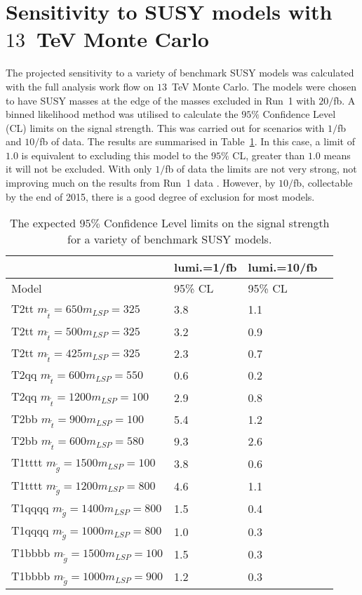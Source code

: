 
\section{Sensitivity to SUSY models with $13$~TeV Monte Carlo}
\label{sec:phys14Results}

The projected sensitivity to a variety of benchmark SUSY models was calculated with the full analysis work flow on $13$~TeV Monte Carlo. The models were chosen to have SUSY masses at the edge of the masses excluded in Run~1 with $20/$fb. A binned likelihood method was utilised to calculate the $95\%$ Confidence Level (CL) limits on the signal strength. This was carried out for scenarios with $1/$fb and $10/$fb of data. The results are summarised in Table~\ref{tab:results}. In this case, a limit of $1.0$ is equivalent to excluding this model to the $95\%$ CL, greater than $1.0$ means it will not be excluded. With only $1/$fb of data the limits are not very strong, not improving much on the results from Run~1 data \cite{susyRun1Twiki}. However, by $10/$fb, collectable by the end of 2015, there is a good degree of exclusion for most models.
 
\begin{table}[h]
\caption{The expected $95\%$ Confidence Level limits on the signal strength for a variety of benchmark SUSY models. \label{tab:results}}
\centering 
\begin{tabular}{ | l | l | l | }
\hline
	&lumi.=1/fb & lumi.=10/fb  \  \\ \hline
	Model & 95\% CL & 95\% CL \\ \hline
	T2tt $m_{\tilde{t}}=650 m_{LSP}=325$ & 3.8 & 1.1 \\ 
	T2tt $m_{\tilde{t}}=500 m_{LSP}=325$ & 3.2 & 0.9 \\ 
	T2tt $m_{\tilde{t}}=425 m_{LSP}=325$ & 2.3 & 0.7 \\ 
	T2qq $m_{\tilde{t}}=600 m_{LSP}=550$ & 0.6 & 0.2 \\ 
	T2qq $m_{\tilde{t}}=1200 m_{LSP}=100$ & 2.9 & 0.8 \\ 
	T2bb $m_{\tilde{t}}=900 m_{LSP}=100$ & 5.4 & 1.2 \\ 
	T2bb $m_{\tilde{t}}=600 m_{LSP}=580$ & 9.3 & 2.6 \\ 
	T1tttt $m_{\tilde{g}}=1500 m_{LSP}=100$ & 3.8 & 0.6 \\ 
	T1tttt $m_{\tilde{g}}=1200 m_{LSP}=800$ & 4.6 & 1.1 \\ 
	T1qqqq $m_{\tilde{g}}=1400 m_{LSP}=800$ & 1.5 & 0.4 \\ 
	T1qqqq $m_{\tilde{g}}=1000 m_{LSP}=800$ & 1.0 & 0.3 \\ 
	T1bbbb $m_{\tilde{g}}=1500 m_{LSP}=100$ & 1.5 & 0.3 \\ 
	T1bbbb $m_{\tilde{g}}=1000 m_{LSP}=900$ & 1.2 & 0.3 \\ \hline
\end{tabular}
\end{table}